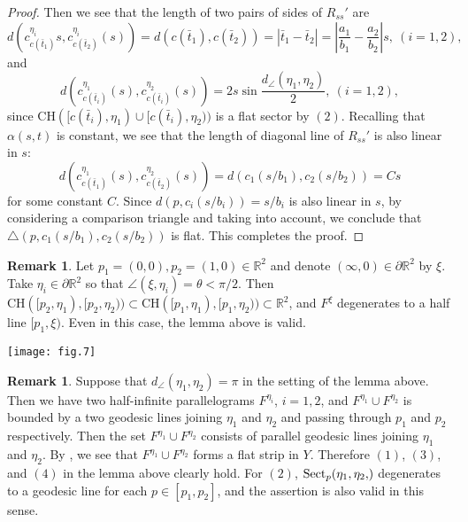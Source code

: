 \documentclass[12pt]{amsart}
\numberwithin{equation}{section}
\theoremstyle{plain}
\theoremstyle{definition}
\newtheorem{Remark}[Theorem]{Remark}
\theoremstyle{remark}
\newcommand{\R}{{\mathbb R}}
\newcommand{\ray}[1]{[#1)}
\newcommand{\cc}[2]{c_{#1}^{#2}}
\newcommand{\tri}[3]{\triangle(#1,#2,#3)}
\newcommand{\ch}[1]{\mathrm{CH}(#1)}
\newcommand{\sect}[3][]{\mathrm{Sect}_{#1}(#2,#3)}
\begin{document}
\begin{proof}
 \vspace{0.3cm}
 \noindent
 Then we see that the length of two pairs of sides of $R_{ss}'$ are
\begin{equation*}
  d(\cc{c(\bar t_1)}{\eta_i}{s}, \cc{c(\bar t_2)}{\eta_i}(s))=
  d(c(\bar t_1),c(\bar t_2)) = |\bar t_1- \bar t_2| =
 \left|\frac{a_1}{b_1}-\frac{a_2}{b_2} \right|s, \ (i=1,2),  
\end{equation*} 
 and
 \begin{equation*}
  d(\cc{c(\bar t_i)}{\eta_1}(s), \cc{c(\bar t_i)}{\eta_2}(s))
  = 2s \sin \frac{d_{\angle}(\eta_1,\eta_2)}{2}, \ (i=1,2), 
 \end{equation*}
 since 
 $\ch{\ray{c(\bar t_i),\eta_1} \cup \ray{c(\bar t_i),\eta_2}}$
 is a flat sector by $(2)$. 
 Recalling that $\alpha(s,t)$ is constant, we see that
 the length of diagonal line of $R_{ss}'$ is also linear in $s$: 
\begin{equation*}
 d(\cc{c(\bar t_1)}{\eta_1}(s),\cc{c(\bar t_2)}{\eta_2}(s))
 =   d(c_1(s/b_1),c_2(s/b_2)) = Cs 
\end{equation*} 
 for some constant $C$. 
 Since $d(p,c_i(s/b_i))=s/b_i$ is also linear in $s$, 
 by considering a comparison triangle and taking 
 \cite[p.~181, 2.10 Exercises (1)]{bridson-haefliger} into account, 
 we conclude that $\tri{p}{c_1(s/b_1)}{c_2(s/b_2)}$ is flat.  
 This completes the proof. 
\end{proof}

\noindent
\begin{minipage}[c]{9cm}
 \begin{Remark}
 \label{remark:degenerate_to_half_line}
  Let $p_1=(0,0), p_2=(1,0) \in \R^2$ and denote 
  $(\infty,0) \in \partial \R^2$ by $\xi$. 
  Take $\eta_i \in \partial \R^2$ so that 
  $\angle(\xi, \eta_i)=\theta < \pi/2$. 
  Then 
  $\ch{\ray{p_2,\eta_1},\ray{p_2,\eta_2}}\subset
  \ch{\ray{p_1,\eta_1},\ray{p_1,\eta_2}} \subset \R^2$, 
  and $F^{\xi}$ degenerates to a half line $\ray{p_1,\xi}$. 
  Even in this case, the lemma above is valid. 
\end{Remark}
\end{minipage}
\begin{minipage}[b]{6cm}
 \hspace{2cm}
 \texttt{[image: fig.7]}
\end{minipage} 

\begin{Remark}
\label{remark:when_angle_is_pi}
 Suppose that $d_{\angle}(\eta_1,\eta_2)=\pi$ in the setting of the
 lemma above.  
 Then we have two half-infinite parallelograms $F^{\eta_i}$, $i=1,2$,
 and $F^{\eta_1}\cup F^{\eta_2}$ is bounded by a two geodesic lines
 joining $\eta_1$ and $\eta_2$ and passing through $p_1$ and $p_2$
 respectively. 
 Then the set $F^{\eta_1}\cup F^{\eta_2}$ consists of parallel geodesic
 lines joining $\eta_1$ and $\eta_2$.
 By \cite[p.~182, The Flat Strip Theorem]{bridson-haefliger}, we see
 that $F^{\eta_1}\cup F^{\eta_2}$ forms a flat strip in $Y$.  
 Therefore $(1)$, $(3)$, and  $(4)$ in the lemma above clearly hold. 
 For $(2)$, $\sect[p]{\eta_1,\eta_2}$ degenerates to a geodesic
 line for each $p \in [p_1,p_2]$, and the assertion is also valid in
 this sense.  
\end{Remark}
\end{document}
